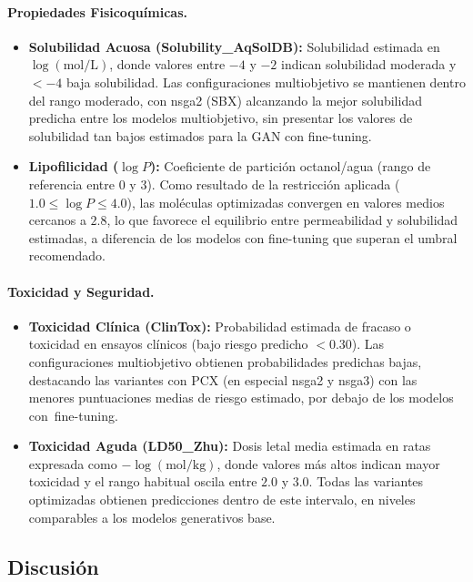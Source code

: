 \paragraph{Propiedades Fisicoquímicas.}
\begin{itemize}
    \item \textbf{Solubilidad Acuosa (Solubility\_AqSolDB):} Solubilidad estimada en $\log(\text{mol/L})$, donde valores entre $-4$ y $-2$ indican solubilidad moderada y $<-4$ baja solubilidad. Las configuraciones multiobjetivo se mantienen dentro del rango moderado, con \acrshort{nsga2} (SBX) alcanzando la mejor solubilidad predicha entre los modelos multiobjetivo, sin presentar los valores de solubilidad tan bajos estimados para la GAN con fine-tuning.
    \item \textbf{Lipofilicidad ($\log P$):} Coeficiente de partición octanol/agua (rango de referencia entre $0$ y $3$). Como resultado de la restricción aplicada ($1.0 \le \log P \le 4.0$), las moléculas optimizadas convergen en valores medios cercanos a $2.8$, lo que favorece el equilibrio entre permeabilidad y solubilidad estimadas, a diferencia de los modelos con fine-tuning que superan el umbral recomendado.
\end{itemize}

\paragraph{Toxicidad y Seguridad.}
\begin{itemize}
    \item \textbf{Toxicidad Clínica (ClinTox):} Probabilidad estimada de fracaso o toxicidad en ensayos clínicos (bajo riesgo predicho $<0.30$). Las configuraciones multiobjetivo obtienen probabilidades predichas bajas, destacando las variantes con PCX (en especial \acrshort{nsga2} y \acrshort{nsga3}) con las menores puntuaciones medias de riesgo estimado, por debajo de los modelos con~fine-tuning.
    \item \textbf{Toxicidad Aguda (LD50\_Zhu):} Dosis letal media estimada en ratas expresada como $-\log(\text{mol/kg})$, donde valores más altos indican mayor toxicidad y el rango habitual oscila entre $2.0$ y $3.0$. Todas las variantes optimizadas obtienen predicciones dentro de este intervalo, en niveles comparables a los modelos generativos base.
\end{itemize}

\subsection{Discusión}
\label{subsec:discusion_mrp1}
\label{sec:discusion}

